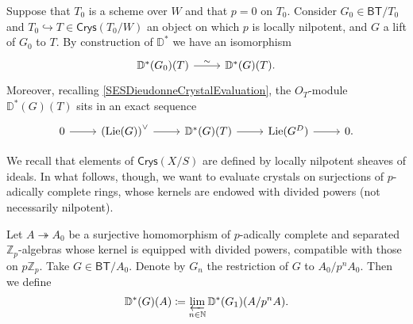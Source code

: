 \begin{rem}[]\label{rem:DGValuationRestriction}
	Suppose that $T_0$ is a scheme over $W$ and that $p = 0$ on $T_0$.
	Consider $G_0 \in \mathsf{BT}/T_0$ and $T_0 \hookrightarrow T \in \mathsf{Crys}(T_0/W)$
	an object on which $p$ is locally nilpotent, and $G$ a lift of $G_0$ to $T$.
	By construction of $\mathbb{D}^*$ we have an isomorphism
	\begin{equation*}
	\begin{tikzcd}[row sep = 0ex
		,/tikz/column 1/.append style={anchor=base east}
		,/tikz/column 2/.append style={anchor=base west}]
		\mathbb{D}^*(G_0)(T) \arrow[r, "\sim", rightarrow] &
		\mathbb{D}^*(G)(T)
	.\end{tikzcd}
	\end{equation*} 
	Moreover, recalling \cref{SESDieudonneCrystalEvaluation},
	the $O_{ T }$-module $\mathbb{D}^*(G)(T)$ sits in an exact sequence
	\begin{equation*}
	\begin{tikzcd}
		0 \arrow[r, "", rightarrow] &
		\left( \mathrm{Lie}(G) \right)^\vee \arrow[r, "", rightarrow] &
		\mathbb{D}^*(G)(T) \arrow[r, "", rightarrow] &
		\mathrm{Lie}(G^D) \arrow[r, "", rightarrow] &
		0
	.\end{tikzcd}
	\end{equation*}
\end{rem}


\noindent
We recall that elements of $\mathsf{Crys}(X/S)$ are defined by
locally nilpotent sheaves of ideals.
In what follows, though, we want to evaluate crystals on
surjections of $p$-adically complete rings, whose kernels are endowed with divided powers
(not necessarily nilpotent).
\begin{defn}[]\label{defn:NotNilpotentEvaluation}
	Let $A \twoheadrightarrow A_0$ be a surjective homomorphism
	of $p$-adically complete and separated $\mathbb{Z}_{p}$-algebras
	whose kernel is equipped with divided powers, compatible with those on $p \mathbb{Z}_{p}$.
	Take $G \in \mathsf{BT}/A_0$.
	Denote by $G_n$ the restriction of $G$ to $A_0/p^nA_0$.
	Then we define
	\begin{equation*}
		\mathbb{D}^*(G)(A) \coloneqq
		\varprojlim_{n \in \mathbb{N}} \mathbb{D}^*(G_1)(A/p^nA)
	.\end{equation*}
\end{defn}


